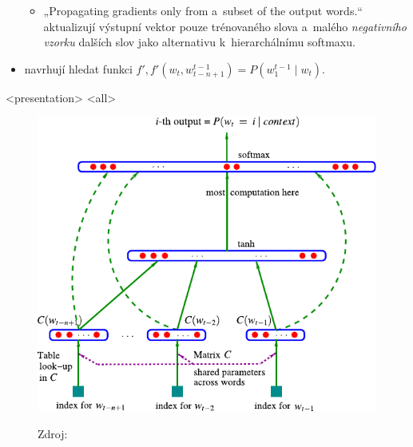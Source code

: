 \begin{frame}
\begin{itemize}[<+->]
{\begin{itemize}
\item<9-9> „\foreignlanguage{english}{Propagating gradients only from a~subset of the output words.}“
  \textcite{mikolov13c} aktualizují výstupní vektor pouze trénovaného slova
    a~malého \emph{negativního vzorku} dalších slov
    jako alternativu k~hierarchálnímu softmaxu.
\end{itemize}}
\item<10-12> \textcite{mikolov13a} navrhují hledat funkci
  $f', f'(w_t, w_{t-n+1}^{t-1}) = P(w_1^{t-1}\mid w_t)$.
\end{itemize}
\mode
<presentation>
\vspace{10cm}
\mode
<all>
\end{frame}

\begin{frame}
\begin{figure}[H]
\begin{center}
\includegraphics[width=0.5\paperwidth]{figs/bengio03}
\bigskip\par
Zdroj: \textcite{bengio03}
\end{center}
\end{figure}
\end{frame}


